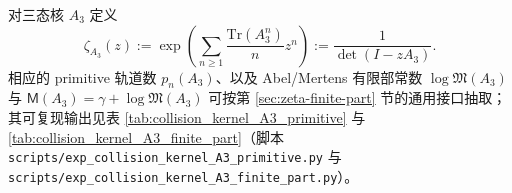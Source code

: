 \begin{definition}\label{def:pom-collision-zeta-a3}
对三态核 \(A_3\) 定义
$$
\zeta_{A_3}(z):=\exp\!\left(\sum_{n\ge 1}\frac{\mathrm{Tr}(A_3^n)}{n}z^n\right)
:=\frac{1}{\det(I-zA_3)}.
$$
相应的 primitive 轨道数 \(p_n(A_3)\)、以及 Abel/Mertens 有限部常数 \(\log\mathfrak{M}(A_3)\) 与 \(\mathsf{M}(A_3)=\gamma+\log\mathfrak{M}(A_3)\) 可按第 \ref{sec:zeta-finite-part} 节的通用接口抽取；其可复现输出见表 \ref{tab:collision_kernel_A3_primitive} 与 \ref{tab:collision_kernel_A3_finite_part}（脚本 \texttt{scripts/exp\_collision\_kernel\_A3\_primitive.py} 与 \texttt{scripts/exp\_collision\_kernel\_A3\_finite\_part.py}）。
\end{definition}



